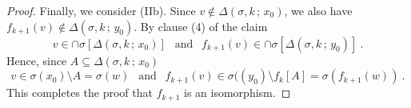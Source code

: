 \documentclass[10pt,a4paper]{amsart}
\begin{document}
\begin{proof}
Finally,  we consider (IIb). 
Since   $  v  \not\in   \Delta \left(  \sigma , k \,  ;   \,   x_0   \right)    $,  
we also have     $  f_{ k+1}   \left( v  \right)    \not\in   \Delta \left(  \sigma , k \,  ;   \,   y_0   \right)    $. 
By clause (4)  of the claim  
\[
v  \in  \cap   \sigma  \left[       \Delta \left(  \sigma , k \,  ;   \,   x_0   \right)     \right]   
\    \     \mbox{  and   }     \      \  
f_{ k+1}  \left( v  \right)   \in  \cap   \sigma  \left[       \Delta \left(  \sigma , k \,  ;   \,   y_0   \right)     \right]   
\     .
\] 
Hence,  since   $  A  \subseteq      \Delta \left(  \sigma , k \,  ;   \,   x_0   \right)    $
\[
v  \in     \sigma  ( x_0  )   \setminus  A   =   \sigma ( w )  
\     \    \mbox{  and   }    \     \
f_{ k+1}  \left( v  \right)   \in        \sigma  (\left(   y_0      \right)   \setminus   f_k  \left[ A  \right]        =   \sigma   \left(   f_{ k+1}    (w )    \right)  
\      .
\]
This completes the proof that  $  f_{ k+1}  $  is an isomorphism.
\end{proof}
\end{document}
